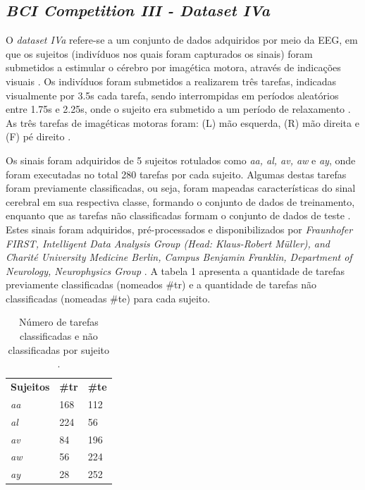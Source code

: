 \subsection{\textit{BCI Competition III - Dataset IVa}}
O \textit{dataset IVa} refere-se a um conjunto de dados adquiridos por meio da EEG, em que os sujeitos (indivíduos nos quais foram capturados os sinais) foram submetidos a estimular o cérebro por imagética motora, através de indicações visuais \cite{BCICompetition}. Os indivíduos foram submetidos a realizarem três tarefas, indicadas visualmente por 3.5s cada tarefa, sendo interrompidas em períodos aleatórios entre 1.75s e 2.25s, onde o sujeito era submetido a um período de relaxamento \cite{BCICompetition}. As três tarefas de imagéticas motoras foram: (L) mão esquerda, (R) mão direita e (F) pé direito \cite{BCICompetition}.

Os sinais foram adquiridos de 5 sujeitos rotulados como \textit{aa, al, av, aw} e \textit{ay}, onde foram executadas no total 280 tarefas por cada sujeito. Algumas destas tarefas foram previamente classificadas, ou seja, foram mapeadas características do sinal cerebral em sua respectiva classe, formando o conjunto de dados de treinamento, enquanto que as tarefas não classificadas formam o conjunto de dados de teste \cite{siteBCI}. Estes sinais foram adquiridos, pré-processados e disponibilizados por \textit{Fraunhofer FIRST, Intelligent Data Analysis Group (Head: Klaus-Robert Müller), and Charité University Medicine Berlin, Campus Benjamin Franklin, Department of Neurology, Neurophysics Group} \cite{BCICompetition}. A tabela 1 apresenta a quantidade de tarefas previamente classificadas (nomeados \#tr) e a quantidade de tarefas não classificadas (nomeadas \#te) para cada sujeito.

\begin{table}[h!]
	\centering
	\caption{Número de tarefas classificadas e não classificadas por sujeito \cite{BCICompetition}.}
	\label{my-label}
	\begin{tabular}{lll}
		\textbf{Sujeitos} & \textbf{\#tr} & \textbf{\#te} \\
		\textit{aa} & 168 & 112 \\
		\textit{al} & 224 & 56 \\
		\textit{av} & 84 & 196 \\
		\textit{aw} & 56 & 224 \\
		\textit{ay} & 28 & 252
	\end{tabular}
\end{table}
 
